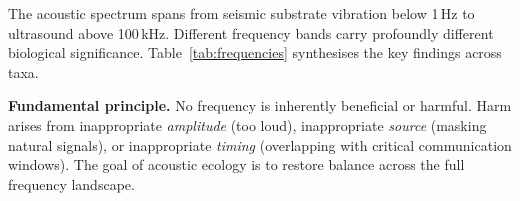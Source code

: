 \documentclass[12pt, a4paper]{article}
\begin{document}
The acoustic spectrum spans from seismic substrate vibration below 1\,Hz to ultrasound above
100\,kHz. Different frequency bands carry profoundly different biological significance.
Table~\ref{tab:frequencies} synthesises the key findings across taxa.

\begin{greenbox}
\textbf{Fundamental principle.} No frequency is inherently beneficial or harmful. Harm arises
from inappropriate \textit{amplitude} (too loud), inappropriate \textit{source} (masking natural
signals), or inappropriate \textit{timing} (overlapping with critical communication windows).
The goal of acoustic ecology is to restore balance across the full frequency landscape.
\end{greenbox}

\vspace{8pt}
\end{document}
